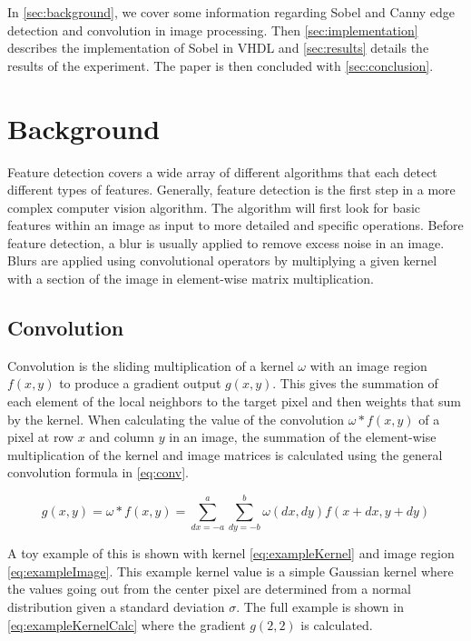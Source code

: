 \documentclass[12pt]{article}
\begin{document}
		In \autoref{sec:background}, we cover some information regarding Sobel and Canny edge detection and convolution in image processing. Then \autoref{sec:implementation} describes the implementation of Sobel in VHDL and \autoref{sec:results} details the results of the experiment. The paper is then concluded with \autoref{sec:conclusion}.

	\section{Background}
		\label{sec:background}

		Feature detection covers a wide array of different algorithms that each detect different types of features. Generally, feature detection is the first step in a more complex computer vision algorithm. The algorithm will first look for basic features within an image as input to more detailed and specific operations. Before feature detection, a blur is usually applied to remove excess noise in an image. Blurs are applied using convolutional operators by multiplying a given kernel with a section of the image in element-wise matrix multiplication. 

		\subsection{Convolution}
			Convolution is the sliding multiplication of a kernel $\omega$ with an image region $f(x,y)$ to produce a gradient output $g(x,y)$. This gives the summation of each element of the local neighbors to the target pixel and then weights that sum by the kernel. When calculating the value of the convolution $\omega * f(x,y)$ of a pixel at row $x$ and column $y$ in an image, the summation of the element-wise multiplication of the kernel and image matrices is calculated using the general convolution formula in \eqref{eq:conv}.

			\begin{equation}
				\label{eq:conv}
				g(x, y) = \omega * f(x, y) = \sum_{dx = -a}^{a}{\sum_{dy = -b}^{b}{\omega(dx, dy)f(x + dx, y + dy)}}
			\end{equation}

			A toy example of this is shown with kernel \eqref{eq:exampleKernel} and image region \eqref{eq:exampleImage}. This example kernel value is a simple Gaussian kernel where the values going out from the center pixel are determined from a normal distribution given a standard deviation $\sigma$. The full example is shown in \eqref{eq:exampleKernelCalc} where the gradient $g(2, 2)$ is calculated.
\end{document}
